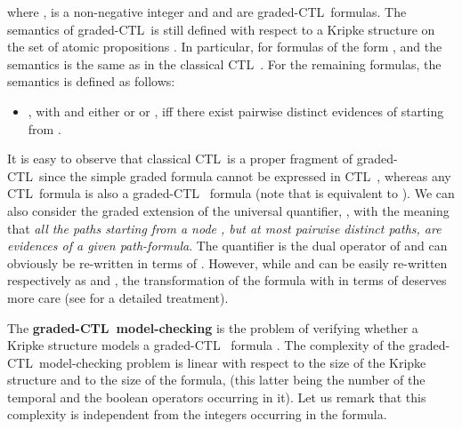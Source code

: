 \documentclass[letterpaper,twocolumn,10pt]{article}
\newcommand{\ignore}[1]{}
\def    \ctl        {\mbox{\textsc{CTL }\xspace}}
\begin{document}
where ,  is a non-negative integer and  and
 are graded-\ctl formulas.
The semantics of graded-\ctl is still defined with respect to a
Kripke structure  on the set
of atomic propositions . In particular, for formulas of the
form ,  and  the semantics is the same as in the classical \ctl.
For the remaining formulas, the semantics is defined as follows:
\begin{itemize}
\item
, with  and either  or  or , iff there exist  pairwise
distinct evidences of  starting from .
\end{itemize}
It is easy to observe that classical \ctl is a proper fragment of
graded-\ctl since the simple graded formula  cannot be
expressed in \ctl, whereas any \ctl formula is also a graded-\ctl
formula  (note that  is equivalent to ).
We can also consider the graded extension of the universal
quantifier, , with the meaning that \emph{all the
paths starting from a node , but at most  pairwise distinct
paths, are evidences of a given path-formula}. The quantifier
 is the dual operator of  and can obviously be
re-written in terms of . However, while  and  can be easily re-written
respectively as  and , the transformation of the formula  with  in terms of  deserves more care
(see \cite{FNP08} for a detailed treatment).
\ignore{
In fact, we have that 
is equivalent to  (note that this formula is
not a graded-\ctl formula because of the occurrence of the
innermost negation), that can be translated in graded-\ctl in the
following way:


In fact observe that a path not
satisfying  is a path that satisfies either
 or  (clearly,
the paths satisfying  are all distinct from the paths
satisfying ). Therefore the formula  holds in , if  pairwise distinct paths stem
from this, each satisfying either  or .
}

The \textbf{graded-\ctl model-checking} is the problem of
verifying whether a Kripke structure  models a graded-\ctl
formula .
The complexity of the graded-\ctl model-checking problem
is linear with respect to the size of
the Kripke structure and to the size of the formula,
(this latter being the number of the temporal and the boolean
operators occurring in it). Let us remark that this complexity is
independent from the integers  occurring in the formula.
\end{document}
